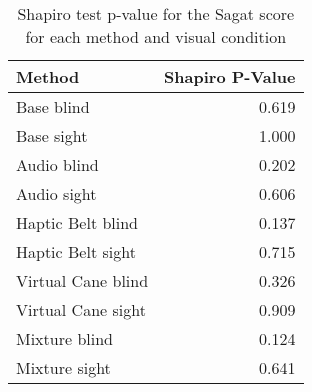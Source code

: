 
\begin{table}[!htb]
\centering
\caption{Shapiro test p-value for the Sagat score for each method and visual condition}
\label{tab:shapiro_sagat_score}
\begin{tabular}{lr}
\toprule
            Method &  Shapiro P-Value \\
\midrule
        Base blind &            0.619 \\
        Base sight &            1.000 \\
       Audio blind &            0.202 \\
       Audio sight &            0.606 \\
 Haptic Belt blind &            0.137 \\
 Haptic Belt sight &            0.715 \\
Virtual Cane blind &            0.326 \\
Virtual Cane sight &            0.909 \\
     Mixture blind &            0.124 \\
     Mixture sight &            0.641 \\
\bottomrule
\end{tabular}
\end{table}

